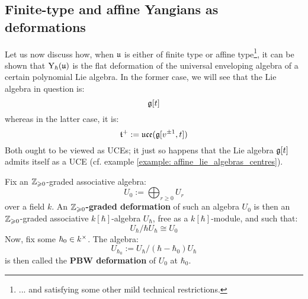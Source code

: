     \subsection{Finite-type and affine Yangians as deformations} \label{subsection: yangians_as_deformations}
        Let us now discuss how, when $\mathfrak{u}$ is either of finite type or affine type\footnote{... and satisfying some other mild technical restrictions.}, it can be shown that $\mathrm{Y}_{\hbar}(\mathfrak{u})$ is the flat deformation of the universal enveloping algebra of a certain polynomial Lie algebra. In the former case, we will see that the Lie algebra in question is:
            $$\mathfrak{g}[t]$$
        whereas in the latter case, it is:
            $$\mathfrak{t}^{+} := \mathfrak{uce}(\mathfrak{g}[v^{\pm 1}, t])$$
        Both ought to be viewed as UCEs; it just so happens that the Lie algebra $\mathfrak{g}[t]$ admits itself as a UCE (cf. example \ref{example: affine_lie_algebras_centres}).
    
        \begin{definition} \label{def: graded_and_PBW_deformations}
            Fix an $\mathbb{Z}_{\geqslant 0}$-graded associative algebra:
                $$U_0 := \bigoplus_{r \geq 0} U_r$$
            over a field $k$. An \textbf{$\mathbb{Z}_{\geqslant 0}$-graded deformation} of such an algebra $U_0$ is then an $\mathbb{Z}_{\geqslant 0}$-graded associative $k[\hbar]$-algebra $U_{\hbar}$, free as a $k[\hbar]$-module, and such that:
                $$U_{\hbar}/\hbar U_{\hbar} \cong U_0$$
            Now, fix some $\hbar_0 \in k^{\x}$. The algebra:
                $$U_{\hbar_0} := U_{\hbar}/(\hbar - \hbar_0)U_{\hbar}$$
            is then called the \textbf{PBW deformation} of $U_0$ at $\hbar_0$.  
        \end{definition}
